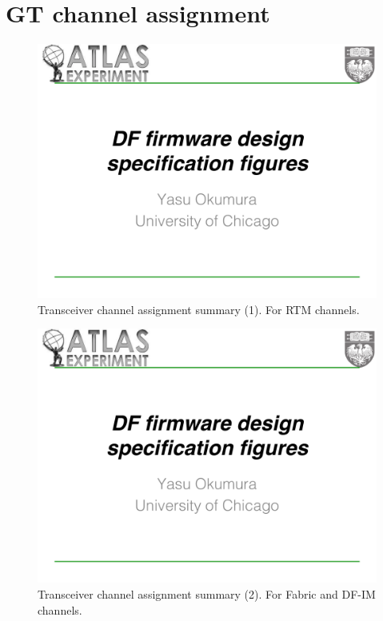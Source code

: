 \documentclass[11pt,letterpaper]{article}
\begin{document}
\section{GT channel assignment}
\begin{figure}[h!]
  \centering
  \includegraphics[width=1.0\textwidth,clip,page=14]{figures.pdf}
  \caption{Transceiver channel assignment summary (1). For RTM channels.}
  \label{fig:GTChannel1}
\end{figure}

\begin{figure}[h!]
  \centering
  \includegraphics[width=1.0\textwidth,clip,page=15]{figures.pdf}
  \caption{Transceiver channel assignment summary (2). For Fabric and DF-IM channels.}
  \label{fig:GTChannel2}
\end{figure}
\end{document}
